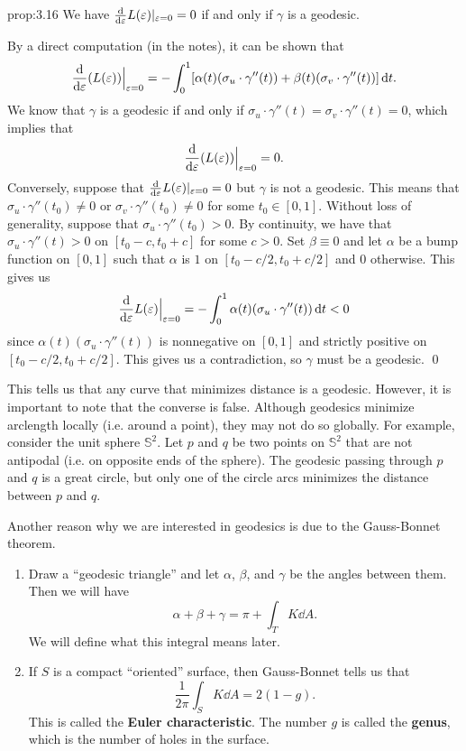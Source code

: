 \begin{prop}{prop:3.16}
    We have $\frac{\rm d}{{\rm d}\varepsilon} L(\varepsilon)|_{\varepsilon=0} = 0$ if and only 
    if $\gamma$ is a geodesic. 
\end{prop}\vspace{-0.25cm} 
\begin{pf}
    By a direct computation (in the notes), it can be shown that 
    \[ \frac{\rm d}{{\rm d}\varepsilon} (L(\varepsilon)) \Big|_{\varepsilon=0} 
    = -\int_0^1 [\alpha(t) (\sigma_u \cdot \gamma''(t)) + 
    \beta(t) (\sigma_v \cdot \gamma''(t))]\,\mathrm{d} t. \] 
    We know that $\gamma$ is a geodesic if and only if 
    $\sigma_u \cdot \gamma''(t) = \sigma_v \cdot \gamma''(t) = 0$, 
    which implies that 
    \[ \frac{\rm d}{{\rm d}\varepsilon} (L(\varepsilon)) \Big|_{\varepsilon=0} = 0. \] 
    Conversely, suppose that $\frac{\rm d}{{\rm d}\varepsilon} L(\varepsilon)|_{\varepsilon=0} = 0$
    but $\gamma$ is not a geodesic. This means that 
    $\sigma_u \cdot \gamma''(t_0) \neq 0$ or $\sigma_v \cdot \gamma''(t_0) \neq 0$ 
    for some $t_0 \in [0, 1]$. Without loss of generality, 
    suppose that $\sigma_u \cdot \gamma''(t_0) > 0$. 
    By continuity, we have that $\sigma_u \cdot \gamma''(t) > 0$ 
    on $[t_0 - c, t_0 + c]$ for some $c > 0$. Set $\beta \equiv 0$ 
    and let $\alpha$ be a bump function on $[0, 1]$ such that 
    $\alpha$ is $1$ on $[t_0 - c/2, t_0 + c/2]$ and $0$ otherwise. This 
    gives us 
    \[ \frac{\rm d}{{\rm d}\varepsilon} L(\varepsilon)\Big|_{\varepsilon=0} = -\int_0^1 
    \alpha(t) (\sigma_u \cdot \gamma''(t))\,\mathrm{d} t < 0 \] 
    since $\alpha(t) (\sigma_u \cdot \gamma''(t))$ is nonnegative 
    on $[0, 1]$ and strictly positive on $[t_0 - c/2, t_0 + c/2]$. 
    This gives us a contradiction, so $\gamma$ must be a geodesic. \qed 
\end{pf}\vspace{-0.25cm}

This tells us that any curve that minimizes distance is a geodesic. 
However, it is important to note that the converse is false. Although 
geodesics minimize arclength locally (i.e. around a point), they 
may not do so globally. 
For example, consider the unit sphere $\mathbb{S}^2$. Let $p$ and 
$q$ be two points on $\mathbb{S}^2$ that are not antipodal (i.e. 
on opposite ends of the sphere). The geodesic passing through 
$p$ and $q$ is a great circle, but only one of the circle arcs 
minimizes the distance between $p$ and $q$. 

Another reason why we are interested in geodesics is due to the Gauss-Bonnet 
theorem.
\begin{enumerate}[(1)]
    \item Draw a ``geodesic triangle'' and let $\alpha$, $\beta$, and $\gamma$ 
    be the angles between them. Then we will have 
    \[ \alpha + \beta + \gamma = \pi + \int_T K\dd A. \] 
    We will define what this integral means later. 

    \item If $S$ is a compact ``oriented'' surface, then Gauss-Bonnet 
    tells us that 
    \[ \frac{1}{2\pi} \int_S K\dd A = 2(1-g). \] 
    This is called the {\bf Euler characteristic}. The
    number $g$ is called the {\bf genus}, which is the number of 
    holes in the surface. 
\end{enumerate}